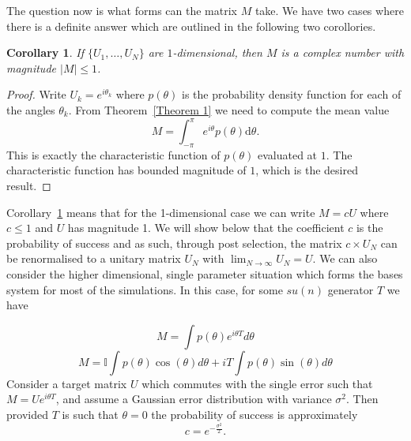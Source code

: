 \documentclass[aps,pra,twocolumn,superscriptaddress,numerical]{revtex4-1}
\newtheorem{corollary}{Corollary}
\begin{document}
The question now is what forms can the matrix $M$ take.  We have two cases where there is a definite answer which are outlined in the following two corollories.

\begin{corollary}
\label{Corollary 1}
	If $\{U_1,\ldots,U_N\}$ are $1$-dimensional, then $M$ is a complex number with magnitude $|M| \leq 1$.
\end{corollary}
\begin{proof}
	Write $U_k = e^{i \theta_k}$ where $p(\theta)$ is the probability density function for each of the angles $\theta_k$. From Theorem~\ref{Theorem 1} we need to compute the mean value 
	\begin{equation}
		M = \int^\pi_{-\pi} e^{i\theta} p(\theta) \mathrm{d}\theta. \label{eq:single parameter, single mode}
	\end{equation}
This is exactly the characteristic function of $p(\theta)$ evaluated at $1$.  The characteristic function has bounded magnitude of $1$, which is the desired result.
\end{proof}

Corollary~\ref{Corollary 1} means that for the 1-dimensional case we can write $M=cU$ where $c \leq 1$ and $U$ has magnitude 1.  We will show below that the coefficient $c$ is the probability of success and as such, through post selection, the matrix $c\times U_{N}$  can be renormalised to a unitary matrix $U_{N}$ with $\lim_{N\rightarrow\infty}U_{N}=U$. We can also consider the higher dimensional, single parameter situation which forms the bases system for most of the simulations. In this case, for some $su(n)$ generator $T$ we have

\begin{equation}
	M=\int p(\theta)e^{i\theta T}d\theta \label{eq:single parameter, multi-mode}
\end{equation}
\begin{equation}
	M=\mathbb{I} \int p(\theta) \cos(\theta)d\theta
		+ i T \int p(\theta) \sin(\theta)d\theta \label{eq:single parameter, multi-mode expanded}
\end{equation}
Consider a target matrix $U$ which commutes with the single error such that $M=Ue^{i\theta T}$, and assume a Gaussian error distribution with variance $\sigma^2$. Then provided $T$ is such that $\theta=0$ %
the probability of success is approximately 
\begin{equation}
	c = e^{-\frac{\sigma^2}{2}}. \label{eq:Gaussian Psuccess}
\end{equation}
\end{document}
